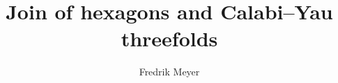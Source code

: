 \documentclass[a4paper]{memoir}
\title{Join of hexagons and Calabi--Yau threefolds}
\author
{
    Fredrik Meyer
}
\begin{document}
    \frontmatter        

    \uiotitle
 
    

    \tableofcontents*    %

    

    \mainmatter     


    
    
    
        

    \appendix           %
    \appendixpage       %

    
    

    \backmatter        
    \printbibliography
\end{document}
